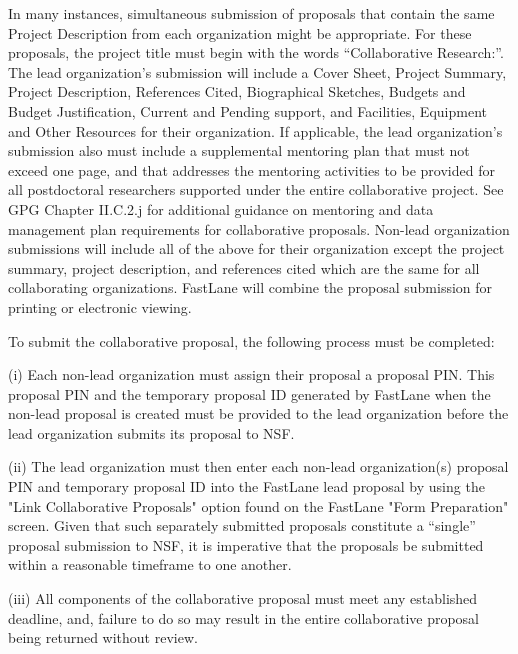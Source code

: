 \documentclass[pdftex,12pt,fullpage,oneside]{amsart}
\begin{document}
In many instances, simultaneous submission of proposals that contain
the same Project Description from each organization might be
appropriate.  For these proposals, the project title must begin with
the words ``Collaborative Research:''.  The lead organization's
submission will include a Cover Sheet, Project Summary, Project
Description, References Cited, Biographical Sketches, Budgets and
Budget Justification, Current and Pending support, and Facilities,
Equipment and Other Resources for their organization.  If applicable,
the lead organization’s submission also must include a supplemental
mentoring plan that must not exceed one page, and that addresses the
mentoring activities to be provided for all postdoctoral researchers
supported under the entire collaborative project.  See GPG Chapter
II.C.2.j for additional guidance on mentoring and data management plan
requirements for collaborative proposals.  Non-lead organization
submissions will include all of the above for their organization
except the project summary, project description, and references cited
which are the same for all collaborating organizations.  FastLane will
combine the proposal submission for printing or electronic viewing.

To submit the collaborative proposal, the following process must be
completed: 

(i) Each non-lead organization must assign their proposal a proposal
PIN.  This proposal PIN and the temporary proposal ID generated by
FastLane when the non-lead proposal is created must be provided to the
lead organization before the lead organization submits its proposal to
NSF. 

(ii) The lead organization must then enter each non-lead
organization(s) proposal PIN and temporary proposal ID into the
FastLane lead proposal by using the "Link Collaborative Proposals"
option found on the FastLane "Form Preparation" screen.  Given that
such separately submitted proposals constitute a “single” proposal
submission to NSF, it is imperative that the proposals be submitted
within a reasonable timeframe to one another.  

(iii) All components of the collaborative proposal must meet any
established deadline, and, failure to do so may result in the entire
collaborative proposal being returned without review.
\end{document}
